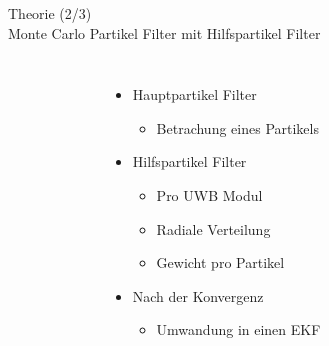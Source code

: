 \documentclass{beamer}
\begin{document}
\begin{frame}{Theorie (2/3)\\Monte Carlo Partikel Filter mit Hilfspartikel Filter}
\begin{columns}
\begin{overlayarea}{\textwidth}{.9\textheight}
{\begin{figure}
						\caption{\cite{blanco2008pure}}
					\end{figure}
				}
			\end{overlayarea}		
			\begin{itemize}
				\item Hauptpartikel Filter
				\begin{itemize}
					\item Betrachung eines Partikels
				\end{itemize}
				\item Hilfspartikel Filter
				\begin{itemize}
					\item Pro UWB Modul
					\item Radiale Verteilung
					\item Gewicht pro Partikel
				\end{itemize}
				\item<4-> Nach der Konvergenz
				\begin{itemize}
					\item Umwandung in einen EKF
				\end{itemize}
			\end{itemize}
	\end{columns}
\end{frame}
\end{document}
